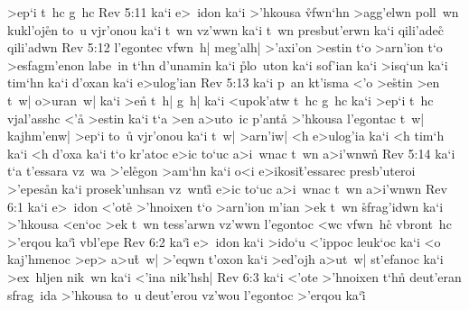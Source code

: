 >ep`i
t~hc
g~hc\bibvsend
\vs Rev 5:11
ka`i
e>~idon
ka`i
>'hkousa
\r{vf}wn`hn
>agg'elwn
poll~wn
kukl'oj\r{e}n
to~u
vjr'onou
ka`i
t~wn
vz'wwn
ka`i
t~wn
presbut'erwn
ka`i
qili'adec\r{}
qili'adwn\bibvsend
\vs Rev 5:12
l'egontec
vfwn~h|
meg'alh|
>'axi'on
>estin
t`o
>arn'ion
t`o
>esfagm'enon
labe~in
t`hn
d'unamin
ka`i
\r{p}lo~uton
ka`i
sof'ian
ka`i
>isq`un
ka`i
tim`hn
ka`i
d'oxan
ka`i
e>ulog'ian\bibvsend
\vs Rev 5:13
ka`i
p~an
kt'isma
<'o
>e\r{s}tin
>en
t~w|
o>uran~w|
ka`i
>en\r{}
t~h|
g~h|
ka`i
<upok'atw
t~hc
g~hc
ka`i
>ep`i
t~hc
vjal'asshc
<'a\r{}
>estin
ka`i
t`a
>en
a>uto~ic
p'ant\r{a}
>'hkousa
l'egontac
t~w|
kajhm'enw|
>ep`i
to~u\r{}
vjr'onou
ka`i
t~w|
>arn'iw|
<h
e>ulog'ia
ka`i
<h
tim`h
ka`i
<h
d'oxa
ka`i
t`o
kr'atoc
e>ic
to`uc
a>i~wnac
t~wn
a>i'wnw\r{n}\bibvsend
{}
\vs Rev 5:14
ka`i
t`a
t'essara
vz~wa
>'el\r{e}gon
>am`hn
ka`i
o<i
e>ikosi\r{t}'essarec
presb'uteroi
>'epes\r{a}n
ka`i
prosek'unhsan
vz~wnti\r{}
e>ic
to`uc
a>i~wnac
t~wn
a>i'wnwn\bibvsend
\vs Rev 6:1
ka`i
e>~idon
<'ot\r{e}
>'hnoixen
t`o
>arn'ion
m'ian
>ek
t~wn
\r{s}frag'idwn
ka`i
>'hkousa
<en`oc
>ek
t~wn
tess'arwn
vz'wwn
l'egontoc
<wc
vfwn~h\r{c}
vbront~hc
>'erqou
ka`i\r{}
vbl'epe\bibvsend
\vs Rev 6:2
ka`i\r{}
e>~idon
ka`i
>ido`u
<'ippoc
leuk`oc
ka`i
<o
kaj'hmenoc
>ep>
a>u\r{t}~w|
>'eqwn
t'oxon
ka`i
>ed'ojh
a>ut~w|
st'efanoc
ka`i
>ex~hljen
nik~wn
ka`i
<'ina
nik'hsh|\bibvsend
\vs Rev 6:3
ka`i
<'ote
>'hnoixen
t`hn\r{}
deut'eran
sfrag~ida
>'hkousa
to~u
deut'erou
vz'wou
l'egontoc
>'erqou
ka`i\r{}
